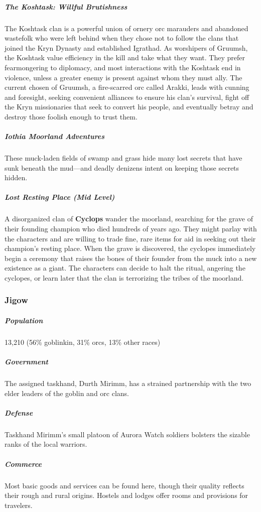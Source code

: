 \documentclass[10pt,a4paper,twoside,bg=print,twocolumn,openany,nodeprecatedcode]{dndbook}
\begin{document}
\subparagraph{The Koshtask: Willful Brutishness}
The Koshtask clan is a powerful union of ornery orc marauders and abandoned wastefolk who were left behind when they chose not to follow the clans that joined the Kryn Dynasty and established Igrathad. As worshipers of Gruumsh, the Koshtask value efficiency in the kill and take what they want. They prefer fearmongering to diplomacy, and most interactions with the Koshtask end in violence, unless a greater enemy is present against whom they must ally. The current chosen of Gruumsh, a fire-scarred orc called Arakki, leads with cunning and foresight, seeking convenient alliances to ensure his clan's survival, fight off the Kryn missionaries that seek to convert his people, and eventually betray and destroy those foolish enough to trust them.

\subparagraph{Iothia Moorland Adventures}
These muck-laden fields of swamp and grass hide many lost secrets that have sunk beneath the mud—and deadly denizens intent on keeping those secrets hidden.

\subparagraph{Lost Resting Place (Mid Level)}
A disorganized clan of \textbf{Cyclops} wander the moorland, searching for the grave of their founding champion who died hundreds of years ago. They might parlay with the characters and are willing to trade fine, rare items for aid in seeking out their champion's resting place. When the grave is discovered, the cyclopes immediately begin a ceremony that raises the bones of their founder from the muck into a new existence as a giant. The characters can decide to halt the ritual, angering the cyclopes, or learn later that the clan is terrorizing the tribes of the moorland.

\subsubsection{Jigow}
\subparagraph{Population}
13,210 (56\% goblinkin, 31\% orcs, 13\% other races)

\subparagraph{Government}
The assigned taskhand, Durth Mirimm, has a strained partnership with the two elder leaders of the goblin and orc clans.

\subparagraph{Defense}
Taskhand Mirimm's small platoon of Aurora Watch soldiers bolsters the sizable ranks of the local warriors.

\subparagraph{Commerce}
Most basic goods and services can be found here, though their quality reflects their rough and rural origins. Hostels and lodges offer rooms and provisions for travelers.
\end{document}
